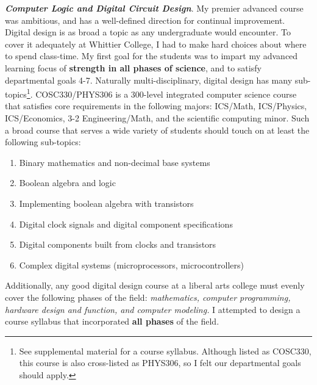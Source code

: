 \documentclass[../../../main.tex]{subfiles}
\begin{document}
\textbf{\textit{Computer Logic and Digital Circuit Design}}. My premier advanced course was ambitious, and has a well-defined direction for continual improvement.  Digital design is as broad a topic as any undergraduate would encounter.  To cover it adequately at Whittier College, I had to make hard choices about where to spend class-time. My first goal for the students was to impart my advanced learning focus of \textbf{strength in all phases of science}, and to satisfy departmental goals 4-7. Naturally multi-disciplinary, digital design has many sub-topics\footnote{See supplemental material for a course syllabus.  Although listed as COSC330, this course is also cross-listed as PHYS306, so I felt our departmental goals should apply.}.  COSC330/PHYS306 is a 300-level integrated computer science course that satisfies core requirements in the following majors: ICS/Math, ICS/Physics, ICS/Economics, 3-2 Engineering/Math, and the scientific computing minor.  Such a broad course that serves a wide variety of students should touch on at least the following sub-topics:

\begin{enumerate}
\item Binary mathematics and non-decimal base systems
\item Boolean algebra and logic
\item Implementing boolean algebra with transistors
\item Digital clock signals and digital component specifications
\item Digital components built from clocks and transistors
\item Complex digital systems (microprocessors, microcontrollers)
\end{enumerate}

Additionally, any good digital design course at a liberal arts college must evenly cover the following phases of the field: \textit{mathematics, computer programming, hardware design and function, and computer modeling.}  I attempted to design a course syllabus that incorporated \textbf{all phases} of the field. \\ \hspace{0.1cm}
\end{document}
